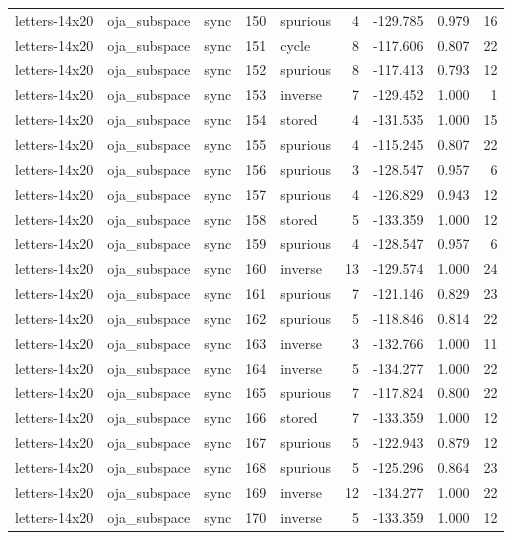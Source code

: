 \begin{tabular}{lllrlrrrr}
letters-14x20 & oja\_subspace & sync & 150 & spurious & 4 & -129.785 & 0.979 & 16 \\
letters-14x20 & oja\_subspace & sync & 151 & cycle & 8 & -117.606 & 0.807 & 22 \\
letters-14x20 & oja\_subspace & sync & 152 & spurious & 8 & -117.413 & 0.793 & 12 \\
letters-14x20 & oja\_subspace & sync & 153 & inverse & 7 & -129.452 & 1.000 & 1 \\
letters-14x20 & oja\_subspace & sync & 154 & stored & 4 & -131.535 & 1.000 & 15 \\
letters-14x20 & oja\_subspace & sync & 155 & spurious & 4 & -115.245 & 0.807 & 22 \\
letters-14x20 & oja\_subspace & sync & 156 & spurious & 3 & -128.547 & 0.957 & 6 \\
letters-14x20 & oja\_subspace & sync & 157 & spurious & 4 & -126.829 & 0.943 & 12 \\
letters-14x20 & oja\_subspace & sync & 158 & stored & 5 & -133.359 & 1.000 & 12 \\
letters-14x20 & oja\_subspace & sync & 159 & spurious & 4 & -128.547 & 0.957 & 6 \\
letters-14x20 & oja\_subspace & sync & 160 & inverse & 13 & -129.574 & 1.000 & 24 \\
letters-14x20 & oja\_subspace & sync & 161 & spurious & 7 & -121.146 & 0.829 & 23 \\
letters-14x20 & oja\_subspace & sync & 162 & spurious & 5 & -118.846 & 0.814 & 22 \\
letters-14x20 & oja\_subspace & sync & 163 & inverse & 3 & -132.766 & 1.000 & 11 \\
letters-14x20 & oja\_subspace & sync & 164 & inverse & 5 & -134.277 & 1.000 & 22 \\
letters-14x20 & oja\_subspace & sync & 165 & spurious & 7 & -117.824 & 0.800 & 22 \\
letters-14x20 & oja\_subspace & sync & 166 & stored & 7 & -133.359 & 1.000 & 12 \\
letters-14x20 & oja\_subspace & sync & 167 & spurious & 5 & -122.943 & 0.879 & 12 \\
letters-14x20 & oja\_subspace & sync & 168 & spurious & 5 & -125.296 & 0.864 & 23 \\
letters-14x20 & oja\_subspace & sync & 169 & inverse & 12 & -134.277 & 1.000 & 22 \\
letters-14x20 & oja\_subspace & sync & 170 & inverse & 5 & -133.359 & 1.000 & 12 \\

\end{tabular}

